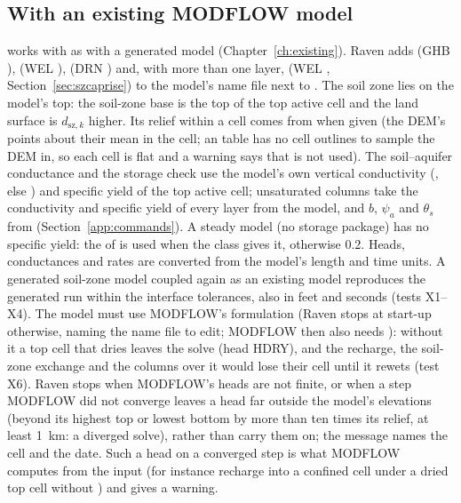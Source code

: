 \subsection{With an existing MODFLOW model}\label{sec:szexisting}
 works with  as with a generated model (Chapter~\ref{ch:existing}). Raven adds
 (GHB ),  (WEL ),  (DRN )
and, with more than one layer,  (WEL , Section~\ref{sec:szcaprise}) to the model's name
file next to . The soil zone lies on the model's top: the soil-zone base is the top
of the top active cell and the land surface is $d_{\mathrm{sz},k}$ higher. Its relief within a cell comes from 
when given (the DEM's points about their mean in the cell; an  table has no cell outlines to sample
the DEM in, so each cell is flat and a warning says that  is not used). The soil--aquifer conductance and the storage check use the model's own vertical
conductivity (, else ) and specific yield of the top active cell; unsaturated columns take the
conductivity and specific yield of every layer from the model, and $b$, $\psi_a$ and $\theta_s$ from
 (Section~\ref{app:commands}). A steady model (no storage package) has no specific yield: the
 of  is used when the class gives it, otherwise 0.2. Heads, conductances and rates are converted from the model's
length and time units. A generated soil-zone model coupled again as an existing model reproduces the generated run
within the interface tolerances, also in feet and seconds (tests X1--X4).
The model must use MODFLOW's  formulation (Raven stops at start-up otherwise, naming the name file to edit;
MODFLOW then also needs ): without it a top cell that dries leaves the solve (head
HDRY), and the recharge, the soil-zone exchange and the columns over it would lose their cell until it rewets (test X6). Raven stops when MODFLOW's heads are not finite, or when a step MODFLOW did not converge leaves a head far outside the
model's elevations (beyond its highest top or lowest bottom by more than ten times its relief, at least 1~km: a diverged
solve), rather than carry them on; the message names the cell and the date. Such a head on a converged step is what
MODFLOW computes from the input (for instance recharge into a confined cell under a dried top cell without
) and gives a warning.

